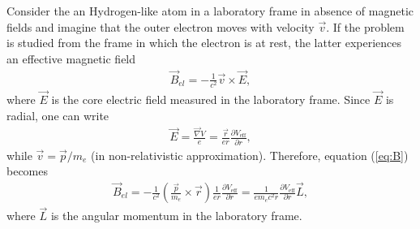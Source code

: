 %

Consider the an Hydrogen-like atom in a laboratory frame in absence of magnetic fields and imagine that the outer electron moves with velocity $\vec{v}$. If the problem is studied from the frame in which the electron is at rest, the latter experiences an effective magnetic field
\begin{align}
    \vec{B}_{el} = -\frac{1}{c^2} \vec{v} \times \vec{E}, 
    \label{eq:B}
\end{align}
where $\vec{E}$ is the core electric field measured in the laboratory frame. Since $\vec{E}$ is radial, one can write 
\begin{align*}
    \vec{E} = \frac{\vec{\nabla}V}{e} = \frac{\vec{r}}{e {r}} \frac{\partial V_\text{eff}}{\partial r} , 
\end{align*}
while $\vec{v} = \vec{p}/m_e$ (in non-relativistic approximation). Therefore, equation (\ref{eq:B}) becomes
\begin{align}
    \vec{B}_{el} = -\frac{1}{c^2} \left( \frac{\vec{p}}{m_e} \times \vec{r} \right) \frac{1}{e {r}} \frac{\partial V_\text{eff} }{\partial r} = \frac{1}{e m_e c^2 r} \frac{\partial V_\text{eff}}{\partial r}  \vec{L}, 
\end{align}
where $\vec{L}$ is the angular momentum in the laboratory frame. \\

